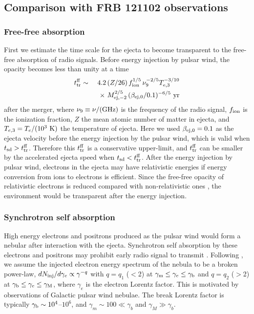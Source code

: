 \documentclass[]{pasj01}
\begin{document}
\subsection{Comparison with FRB 121102 observations}

\subsubsection{Free-free absorption}
First we estimate the time scale for the ejecta to become transparent
to the free-free absorption of radio signals.  Before energy injection
by pulsar wind, the opacity becomes less than unity at a time
\begin{eqnarray}
t_{\rm tr}^{\rm ff} &\sim& 
4.2 \left(Z/26\right)f_{\rm ion}^{1/5}\,\nu_{9}^{-2/5}
T_{{\rm e},3}^{-3/10}     \nonumber \\
&& \ \ \times \ M_{{\rm ej},-2}^{2/5} \, (\beta_{\rm ej, 0}/0.1)^{-6/5} \ \rm yr 
\end{eqnarray}
after the merger,
where $\nu_9 \equiv \nu/({\rm GHz})$ is the frequency of the radio
signal, $f_{\rm ion}$ is the ionization fraction, $Z$ the mean atomic
number of matter in ejecta, and $T_{e,3} = T_e/({\rm
    10^3 \ K})$ the temperature of ejecta. Here we
  used $\beta_{\rm ej, 0}=0.1$ as the ejecta velocity before the
  energy injection by the pulsar wind, which is valid when $t_{\rm sd}
  > t_{\rm tr}^{\rm ff}$.  Therefore this $t_{\rm tr}^{\rm ff}$ is a
  conservative upper-limit, and $t_{\rm tr}^{\rm ff}$ can be smaller
  by the accelerated ejecta speed when $t_{\rm sd} < t_{\rm tr}^{\rm
    ff}$.  After the energy injection by pulsar wind, electrons in
the ejecta may have relativistic energies if energy conversion from
ions to electrons is efficient. Since the free-free opacity of relativistic
electrons is reduced compared with non-relativistic ones
\citep{Kumar:2017yiq}, the environment would be transparent after the
energy injection.


\subsubsection{Synchrotron self absorption}

 High energy electrons and positrons produced as the
  pulsar wind would form a nebular after interaction with the ejecta.
  Synchrotron self absorption by these electrons and positrons may
  prohibit early radio signal to transmit \citep{Murase2016,Yang2016}.
  Following \cite{Murase2016}, we assume the injected electron energy
  spectrum of the nebula to be a broken power-law, $dN_{\rm
    inj}/d\gamma_e \propto \gamma^{-q}$ with $q = q_1$ ($<$2) at
  $\gamma_{\rm m}\leq \gamma_e\leq \gamma_{\rm b}$ and $q = q_2$
  ($>$2) at $\gamma_{\rm b}\leq \gamma_e\leq \gamma_{\rm M}$, where
  $\gamma_e$ is the electron Lorentz factor.  This is motivated by
  observations of Galactic pulsar wind nebulae. The break Lorentz
  factor is typically $\gamma_{\rm b}\sim10^4$--$10^6$, and $\gamma_m
  \sim 100 \ll \gamma_b$ and $\gamma_M \gg \gamma_b$. 
\end{document}
